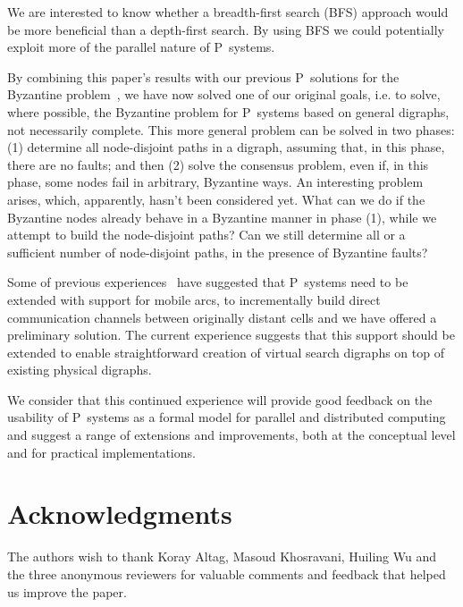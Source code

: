 \documentclass[preliminary,copyright,creativecommons]{eptcs}
\theoremstyle{remark}
\begin{document}
We are interested to know whether a breadth-first search (BFS) approach
would be more beneficial than a depth-first search.  By using BFS we could
potentially exploit more of the parallel nature of P~systems. 

By combining this paper's results with our previous P~solutions
for the Byzantine problem~\cite{DKN-JLAP2010,DKN-CMC2010}, we have now solved one of our original goals, 
i.e. to solve, where possible, the Byzantine problem for P~systems
based on general digraphs, not necessarily complete. 
This more general problem can be solved in two phases:
(1) determine all node-disjoint paths in a digraph, 
assuming that, in this phase, there are no faults; and then 
(2) solve the consensus problem, even if, in this phase, 
some nodes fail in arbitrary, Byzantine ways.
An interesting problem arises, which, apparently, hasn't been considered yet.
What can we do if the Byzantine nodes already behave in a Byzantine manner 
in phase (1), while we attempt to build the node-disjoint paths?
Can we still determine all or a sufficient number of node-disjoint paths,
in the presence of Byzantine faults?

Some of previous experiences~\cite{DKN-MeCBIC2009,NDK-BWMC2009} have suggested that 
P~systems need to be extended with support for mobile arcs,
to incrementally build direct communication channels 
between originally distant cells and we have offered a preliminary solution.
The current experience suggests that this support should
be extended to enable straightforward creation of virtual 
search digraphs on top of existing physical digraphs.

We consider that this continued experience will provide good feedback on
the usability of P~systems as a formal model for parallel and distributed computing
and suggest a range of extensions and improvements, both at the conceptual level
and for practical implementations.


\section*{Acknowledgments}

The authors wish to thank Koray Altag, Masoud Khosravani, Huiling Wu 
and the three anonymous reviewers 
for valuable comments and feedback that helped us improve the paper.



  
\end{document}

